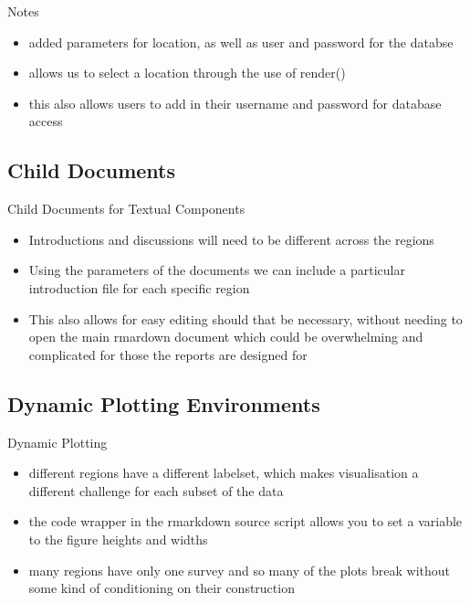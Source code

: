 \documentclass{beamer}
\begin{document}
                \begin{frame}{Notes}
                    \begin{itemize}
                      \item added parameters for location, as well as user and password for the databse
                      \item allows us to select a location through the use of render()
                      \item this also allows users to add in their username and password for database access
                    \end{itemize}
                \end{frame}

          \subsection{Child Documents}
              \begin{frame}{Child Documents for Textual Components}
                  \begin{itemize}
                    \item Introductions and discussions will need to be different across the regions
                    \item Using the parameters of the documents we can include a particular introduction file for each specific region
                    \item This also allows for easy editing should that be necessary, without needing to open the main rmardown document which could be overwhelming and complicated for those the reports are designed for
                  \end{itemize}
              \end{frame}

          \subsection{Dynamic Plotting Environments}
              \begin{frame}{Dynamic Plotting }
                  \begin{itemize}
                    \item different regions have a different labelset, which makes visualisation a different challenge for each subset of the data
                    \item the code wrapper in the rmarkdown source script allows you to set a variable to the figure heights and widths
                    \item many regions have only one survey and so many of the plots break without some kind of conditioning on their construction
                  \end{itemize}
              \end{frame}
\end{document}

